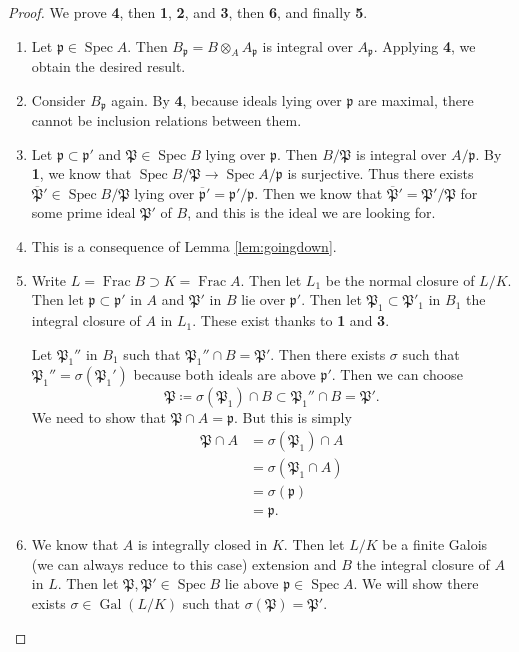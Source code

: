 \documentclass[leqno, openany]{memoir}
\theoremstyle{definition}
\theoremstyle{remark}
\theoremstyle{plain}
\theoremstyle{definition}
\theoremstyle{remark}
\newcommand{\mf}[1]{\mathfrak{#1}}
\newcommand{\ol}[1]{\overline{#1}}
\DeclareMathOperator{\Gal}{Gal}
\DeclareMathOperator{\Spec}{Spec}
\begin{document}
\begin{proof} We prove \textbf{4}, then \textbf{1}, \textbf{2}, and \textbf{3},
    then \textbf{6}, and finally \textbf{5}.       \begin{enumerate} \item Let
        $\mf{p} \in \Spec A$. Then $B_{\mf{p}} = B \otimes_A A_{\mf{p}}$ is
        integral over $A_{\mf{p}}$. Applying \textbf{4}, we obtain the desired
        result.  \item Consider $B_{\mf{p}}$ again. By \textbf{4}, because
        ideals lying over $\mf{p}$ are maximal, there cannot be inclusion
        relations between them.  \item Let $\mf{p} \subset \mf{p}'$ and $\mf{P}
        \in \Spec B$ lying over $\mf{p}$. Then $B / \mf{P}$ is integral over $A
        / \mf{p}$. By \textbf{1}, we know that $\Spec B/\mf{P} \to \Spec A /
        \mf{p}$ is surjective. Thus there exists $\ol{\mf{P}}' \in \Spec B /
        \mf{P}$ lying over $\ol{\mf{p}}' = \mf{p}' / \mf{p}$. Then we know that
        $\ol{\mf{P}}' = \mf{P}' / \mf{P}$ for some prime ideal $\mf{P}'$ of
        $B$, and this is the ideal we are looking for.  \item This is a
        consequence of Lemma \ref{lem:goingdown}.  \item Write $L =
        \operatorname{Frac} B \supset K = \operatorname{Frac} A$. Then let
        $L_1$ be the normal closure of $L / K$. Then let $\mf{p} \subset
        \mf{p}'$ in $A$ and $\mf{P}'$ in $B$ lie over $\mf{p}'$. Then let
        $\mf{P}_1 \subset \mf{P}'_1$ in $B_1$ the integral closure of $A$ in
        $L_1$. These exist thanks to \textbf{1} and \textbf{3}.  

            Let $\mf{P}_1''$ in $B_1$ such that $\mf{P}_1'' \cap B = \mf{P}'$.
            Then there exists $\sigma$ such that $\mf{P}_1'' =
            \sigma(\mf{P}_1')$ because both ideals are above $\mf{p}'$. Then we
            can choose \[ \mf{P} \coloneqq \sigma(\mf{P}_1) \cap B \subset
            \mf{P}_1'' \cap B = \mf{P}'. \] We need to show that $\mf{P} \cap A
            = \mf{p}$. But this is simply \begin{align*} \mf{P} \cap A &=
            \sigma(\mf{P}_1) \cap A \\ &= \sigma(\mf{P}_1 \cap A) \\ &=
        \sigma(\mf{p}) \\ &= \mf{p}.  \end{align*} \item We know that $A$ is
        integrally closed in $K$. Then let $L/K$ be a finite Galois (we can
        always reduce to this case) extension and $B$ the integral closure of
        $A$ in $L$. Then let $\mf{P}, \mf{P}' \in \Spec B$ lie above $\mf{p}
        \in \Spec A$. We will show there exists $\sigma \in \Gal(L/K)$ such
        that $\sigma(\mf{P}) = \mf{P}'$.


\end{enumerate}
\end{proof}
\end{document}
